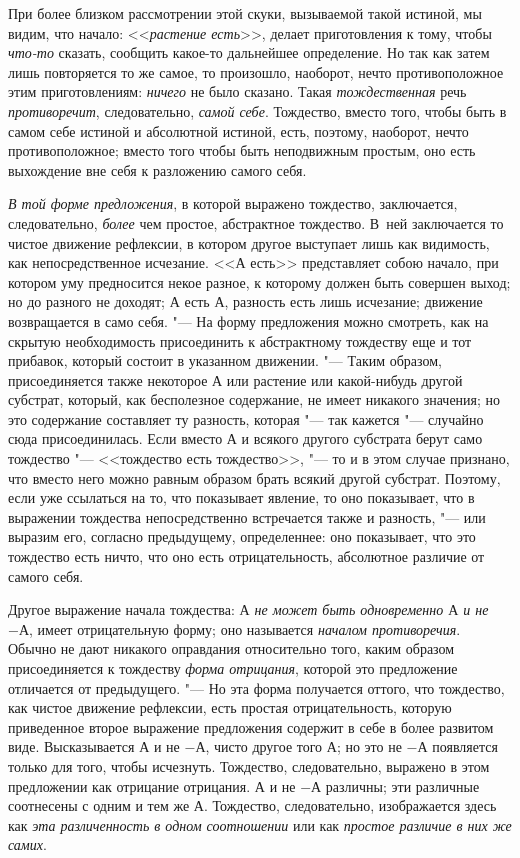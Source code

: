 При более близком рассмотрении этой скуки, вызываемой такой истиной, мы
видим, что начало: <<{\em растение есть}>>, делает
приготовления к тому, чтобы {\em что-то} сказать,
сообщить какое-то дальнейшее определение. Но так как затем лишь повторяется
то же самое, то произошло, наоборот, нечто противоположное этим
приготовлениям: {\em ничего} не было сказано. Такая
{\em тождественная} речь {\em противоречит}, следовательно,
{\em самой себе}. Тождество, вместо того, чтобы быть в
самом себе истиной и абсолютной истиной, есть, поэтому, наоборот, нечто
противоположное; вместо того чтобы быть неподвижным простым, оно есть
выхождение вне себя к разложению самого себя.

{\em В той форме предложения}, в которой выражено
тождество, заключается, следовательно, {\em более} чем
простое, абстрактное тождество. В~ней заключается то чистое движение
рефлексии, в котором другое выступает лишь как видимость, как
непосредственное исчезание. <<$А$ есть>> представляет собою начало,
при котором уму предносится некое разное, к которому должен быть совершен
выход; но до разного не доходят; $А$ есть $А$, разность есть
лишь исчезание; движение возвращается в само себя. "--- На форму предложения
можно смотреть, как на скрытую необходимость присоединить к абстрактному
тождеству еще и тот прибавок, который состоит в указанном движении. "--- Таким
образом, присоединяется также некоторое $А$ или растение или
какой-нибудь другой субстрат, который, как бесполезное содержание, не имеет
никакого значения; но это содержание составляет ту разность, которая "--- так
кажется "--- случайно сюда присоединилась. Если вместо $А$ и всякого другого
субстрата берут само тождество "--- <<тождество есть тождество>>, "--- то и
в этом случае признано, что вместо него можно равным образом брать всякий
другой субстрат. Поэтому, если уже ссылаться на то, что показывает явление,
то оно показывает, что в выражении тождества непосредственно встречается
также и разность, "--- или выразим его, согласно предыдущему, определеннее:
оно показывает, что это тождество есть ничто, что оно есть отрицательность,
абсолютное различие от самого себя.

Другое выражение начала тождества: {\em $А$ не может быть
одновременно $А$ и не $-А$}, имеет отрицательную форму; оно называется
{\em началом противоречия}. Обычно не дают никакого
оправдания относительно того, каким образом присоединяется к тождеству
{\em форма отрицания}, которой это предложение
отличается от предыдущего. "--- Но эта форма получается оттого, что тождество,
как чистое движение рефлексии, есть простая отрицательность, которую
приведенное второе выражение предложения содержит в себе в более развитом
виде. Высказывается $А$ и не $-А$, чисто другое того
$А$; но это не $-А$ появляется только для того, чтобы
исчезнуть. Тождество, следовательно, выражено в этом предложении как
отрицание отрицания. $А$ и не $-А$ различны; эти различные
соотнесены с одним и тем же $А$. Тождество, следовательно,
изображается здесь как {\em эта различенность в одном
соотношении} или как {\em простое различие в них же
самих}.

